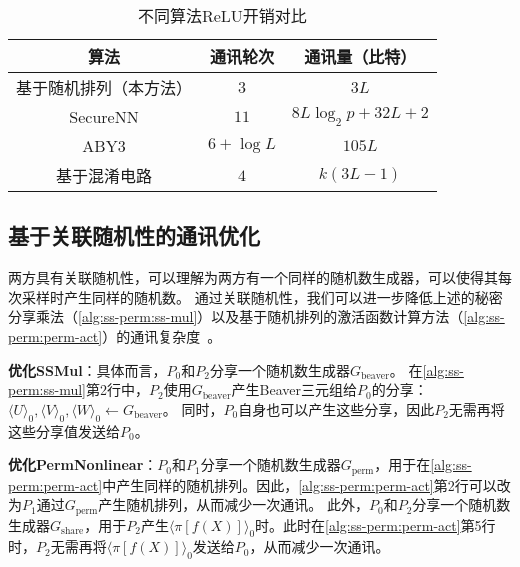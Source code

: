 \begin{table}[t]
    \caption{不同算法ReLU开销对比}
    \label{tab:ss-perm:relu}
    \centering
    \begin{tabular}{ccc}
    \toprule
    算法 & 通讯轮次 & 通讯量（比特） \\ 
    \midrule
    基于随机排列（本方法） & $3$ & $3L$ \\
    SecureNN\cite{wagh2019securenn} & $11$ & $8L\log_2 p + 32L + 2$ \\
    ABY3\cite{mohassel2018aby3} & $6 + \log L$ & $105L$ \\
    基于混淆电路\cite{rouhani2018deepsecure} & $4$ & $k(3L - 1)$ \\
    \bottomrule
    \end{tabular}
\end{table}

\subsection{基于关联随机性的通讯优化}
两方具有关联随机性，可以理解为两方有一个同样的随机数生成器，可以使得其每次采样时产生同样的随机数。
%
通过关联随机性，我们可以进一步降低上述的秘密分享乘法（\autoref{alg:ss-perm:ss-mul}）以及基于随机排列的激活函数计算方法（\autoref{alg:ss-perm:perm-act}）的通讯复杂度~\cite{riazi_2018_chameleon}。
%

\textbf{优化\textsf{SSMul}}：具体而言，$P_0$和$P_2$分享一个随机数生成器$G_\text{beaver}$。
在\autoref{alg:ss-perm:ss-mul}第2行中，$P_2$使用$G_\text{beaver}$产生Beaver三元组给$P_0$的分享：$\langle U \rangle_0, \langle V \rangle_0, \langle W \rangle_0 \gets G_\text{beaver}$。
同时，$P_0$自身也可以产生这些分享，因此$P_2$无需再将这些分享值发送给$P_0$。


\textbf{优化\textsf{PermNonlinear}}：$P_0$和$P_1$分享一个随机数生成器$G_\text{perm}$，用于在\autoref{alg:ss-perm:perm-act}中产生同样的随机排列。因此，\autoref{alg:ss-perm:perm-act}第2行可以改为$P_1$通过$G_\text{perm}$产生随机排列，从而减少一次通讯。
%
此外，$P_0$和$P_2$分享一个随机数生成器$G_\text{share}$，用于$P_2$产生$\langle \pi[f(X)] \rangle_0$时。此时在\autoref{alg:ss-perm:perm-act}第5行时，$P_2$无需再将$\langle \pi[f(X)] \rangle_0$发送给$P_0$，从而减少一次通讯。


